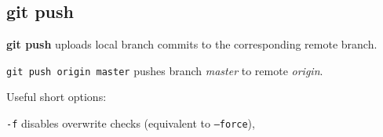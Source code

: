 %

\subsection{git push}
\textbf{git push} uploads local branch commits to the corresponding remote branch.

\texttt{git push origin master} pushes branch \emph{master} to remote \emph{origin}.

Useful short options:
\begin{compactenum}
\item [\texttt{-f}] disables overwrite checks (equivalent to \texttt{--force}),
\end{compactenum}

%